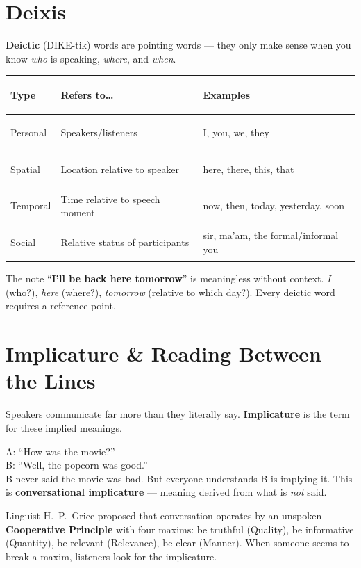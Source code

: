 \documentclass[11pt, letterpaper]{article}
\newcommand{\example}[1]{%
  \begin{tcolorbox}[colback=exbg, colframe=exborder,
    title={\bfseries Example}, arc=3pt, boxrule=1pt]
  #1
  \end{tcolorbox}%
}
\begin{document}
\section*{Deixis}

\textbf{Deictic} (DIKE-tik) words are pointing words --- they only make sense when you know
\emph{who} is speaking, \emph{where}, and \emph{when}.

\noindent
{\renewcommand{\arraystretch}{1.5}
\begin{tabularx}{\textwidth}{>{\bfseries\raggedright\arraybackslash}p{2.5cm}
                              >{\raggedright\arraybackslash}X
                              >{\raggedright\arraybackslash}X}
\toprule
\rowcolor{tableheadergrey}
\textbf{Type} & \textbf{Refers to\ldots} & \textbf{Examples} \\
\midrule
\rowcolor{rowGr} Personal  & Speakers/listeners                    & I, you, we, they \\
\rowcolor{rowA}  Spatial   & Location relative to speaker          & here, there, this, that \\
\rowcolor{rowGr} Temporal  & Time relative to speech moment        & now, then, today, yesterday, soon \\
\rowcolor{rowA}  Social    & Relative status of participants       & sir, ma'am, the formal/informal you \\
\bottomrule
\end{tabularx}}

\example{
The note ``\textbf{I'll be back here tomorrow}'' is meaningless without context. \emph{I} (who?), \emph{here} (where?), \emph{tomorrow} (relative to which day?). Every deictic word requires a reference point.
}

\section*{Implicature \& Reading Between the Lines}

Speakers communicate far more than they literally say. \textbf{Implicature} is the term for these implied meanings.

\example{
A: ``How was the movie?''\\
B: ``Well, the popcorn was good.''\\[4pt]
B never said the movie was bad. But everyone understands B is implying it. This is \textbf{conversational implicature} --- meaning derived from what is \emph{not} said.
}

Linguist H.~P.~Grice proposed that conversation operates by an unspoken \textbf{Cooperative Principle} with four maxims: be truthful (Quality), be informative (Quantity), be relevant (Relevance), be clear (Manner). When someone seems to break a maxim, listeners look for the implicature.
\end{document}
